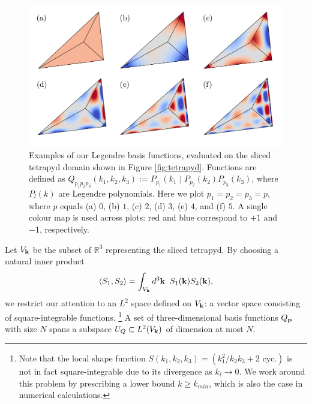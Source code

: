 \begin{figure}
	\centering    
	\includegraphics[width=1.0\textwidth]{legendre_modes_3D_final.pdf}
	\caption{Examples of our Legendre basis functions, evaluated on the sliced tetrapyd domain shown in Figure \ref{fig:tetrapyd}. Functions are defined as $Q_{p_1 p_2 p_3}(k_1,k_2,k_3) := P_{p_1}(k_1) P_{p_2}(k_2) P_{p_3}(k_3)$, where $P_l(k)$ are Legendre polynomials. Here we plot $p_1 = p_2 = p_3 = p$, where $p$ equals (a) $0$, (b) $1$, (c) $2$, (d) $3$, (e) $4$, and (f) $5$. A single colour map is used across plots: red and blue correspond to $+1$ and $-1$, respectively.}	
	\label{fig:Legendre_basis_functions_3D}
\end{figure}

Let $V_{\mathbf{k}}$ be the subset of $\mathbb{R}^3$ representing the sliced tetrapyd. By choosing a natural inner product
\begin{align}
	\left< S_1, S_2 \right> = \int_{V_{\mathbf{k}}} d^3\mathbf{k} \;\; S_1(\mathbf{k}) S_2(\mathbf{k}), \label{eqn:tetrapyd_inner_product}
\end{align}
we restrict our attention to an $L^2$ space defined on $V_{\mathbf{k}}$: a vector space consisting of square-integrable functions.
\footnote{Note that the local shape function $S(k_1,k_2,k_3) = (k_1^2 / k_2 k_3 + \text{2 cyc.})$ is not in fact square-integrable due to its divergence as $k_i \rightarrow 0$. We work around this problem by prescribing a lower bound $k \ge k_{min}$, which is also the case in numerical calculations.}
A set of three-dimensional basis functions $Q_{\mathbf{p}}$ with size $N$ spans a subspace $U_{Q} \subset L^2(V_{\mathbf{k}})$ of dimension at most $N$.

